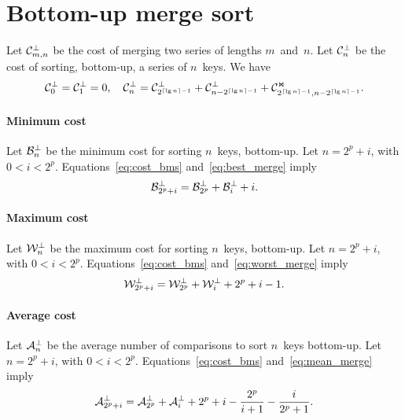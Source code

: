 \section{Bottom-up merge sort}

Let \(\mathcal{C}_{m,n}^{\bot}\) be the cost of merging two series of lengths
\(m\)~and~\(n\). Let \(\mathcal{C}_{n}^{\bot}\) be the cost of sorting,
bottom-up, a series of \(n\)~keys. We have
\begin{equation}
\mathcal{C}_{0}^{\bot} = \mathcal{C}_{1}^{\bot} = 0,\quad
\mathcal{C}_{n}^{\bot} = \mathcal{C}_{2^{\lceil{\lg n}\rceil-1}}^{\bot}
  + \mathcal{C}_{n - 2^{\lceil{\lg n}\rceil-1}}^{\bot} + \mathcal{C}_{2^{\lceil{\lg
        n}\rceil-1},n - 2^{\lceil{\lg n}\rceil-1}}^{\Join}.
\label{eq:cost_bms}
\end{equation}

\paragraph{Minimum cost}

Let \(\mathcal{B}_{n}^{\bot}\) be the minimum cost for sorting \(n\)~keys,
bottom-up. Let \(n=2^p+i\), with \(0 < i < 2^p\).
Equations~\eqref{eq:cost_bms} and~\eqref{eq:best_merge} imply
\begin{equation}
\mathcal{B}_{2^p+i}^{\bot} = \mathcal{B}_{2^p}^{\bot} + \mathcal{B}_{i}^{\bot} + i.
\label{eq:Bbot_2p_i}
\end{equation}

\paragraph{Maximum cost}

Let \(\mathcal{W}_{n}^{\bot}\) be the maximum cost for sorting \(n\)~keys,
bottom-up. Let \(n=2^p+i\), with \(0 < i < 2^p\).
Equations~\eqref{eq:cost_bms} and~\eqref{eq:worst_merge} imply
\begin{equation}
\mathcal{W}_{2^p+i}^{\bot} = \mathcal{W}_{2^p}^{\bot} + \mathcal{W}_{i}^{\bot} + 2^p
+ i - 1.
\label{eq:Wbms_2p_i}
\end{equation}

\paragraph{Average cost}

Let \(\mathcal{A}_{n}^{\bot}\) be the average number of comparisons to sort
\(n\)~keys bottom-up. Let \(n=2^p+i\), with \(0 < i < 2^p\).
Equations~\eqref{eq:cost_bms} and~\eqref{eq:mean_merge} imply
\begin{equation}
\mathcal{A}_{2^p+i}^{\bot} = \mathcal{A}_{2^p}^{\bot} + \mathcal{A}_{i}^{\bot}
+ 2^p + i - \frac{2^p}{i+1} - \frac{i}{2^p+1}.
\label{eq:Abms_2p_i}
\end{equation}
